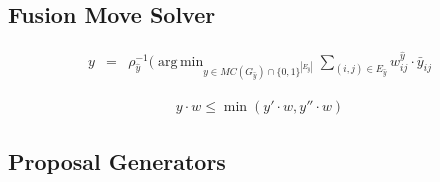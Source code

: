 \documentclass[10pt,twocolumn,letterpaper]{article}
\DeclareMathOperator*{\argmin}{arg\,min}
\begin{document}






\subsection{Fusion Move Solver}




\begin{center}
    \begin{eqnarray}
        y 
        &=& 
        \rho_{\hat{y}}^{-1}(
        \argmin_{y \in MC(G_{\hat{y}})\cap \{0,1\}^{|E_{\hat{y}}|}} 
        \sum_{ (i,j) \in E_{\hat{y}} } 
        w^{\hat{y}}_{ij} \cdot \bar{y}_{ij} 
    \end{eqnarray}
\end{center}

\begin{center}
    \begin{eqnarray}
      y \cdot w \leq \min(y'\cdot w,  y'' \cdot w) 
    \end{eqnarray}
\end{center}


\subsection{Proposal Generators}
\end{document}
